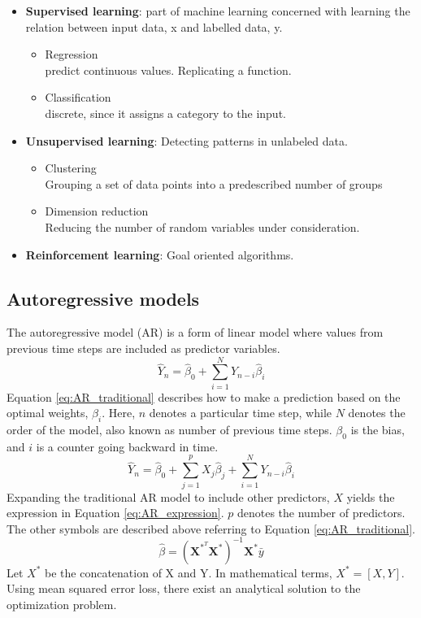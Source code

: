 \documentclass{article}
\begin{document}
\begin{itemize}
    \item \textbf{Supervised learning}: part of machine learning concerned with learning the relation between input data, x and labelled data, y.
    \begin{itemize}
        \item Regression\\predict continuous values. Replicating a function.
        \item Classification\\discrete, since it assigns a category to the input.
    \end{itemize}
    \item \textbf{Unsupervised learning}: Detecting patterns in unlabeled data.
    \begin{itemize}
        \item Clustering\\Grouping a set of data points into a predescribed number of groups
        \item Dimension reduction\\Reducing the number of random variables under consideration.
    \end{itemize}
    \item \textbf{Reinforcement learning}: Goal oriented algorithms.
\end{itemize}

\subsection{Autoregressive models} \label{sec:ARmodels}
The autoregressive model (AR) is a form of linear model where values from previous time steps are included as predictor variables. 
\begin{equation} \label{eq:AR_traditional}
    \hat{Y}_n = \hat{\beta}_0 + \sum_{i = 1}^{N} Y_{n-i} \hat{\beta}_{i}
\end{equation}
Equation \eqref{eq:AR_traditional} describes how to make a prediction based on the optimal weights, $\beta_i$. Here, $n$ denotes a particular time step, while $N$ denotes the order of the model, also known as number of previous time steps. $\beta_0$ is the bias, and $i$ is a counter going backward in time.
\begin{equation} \label{eq:AR_expression}
    \hat{Y}_n = \hat{\beta}_0 + \sum_{j=1}^p X_j\hat{\beta}_j + \sum_{i = 1}^{N} Y_{n-i}\hat{\beta}_{i}
\end{equation}
Expanding the traditional AR model to include other predictors, $X$ yields the expression in Equation \ref{eq:AR_expression}. $p$ denotes the number of predictors. The other symbols are described above referring to Equation \ref{eq:AR_traditional}.
\begin{equation} \label{eq:AR_solution}
    \hat{ \beta } = \left( \textbf{X}^{*^T}\textbf{X}^* \right)^{-1}\textbf{X}^*\bar{y}
\end{equation}
Let $X^*$ be the concatenation of X and Y. In mathematical terms, $X^*=[X, Y]$. Using mean squared error loss, there exist an analytical solution to the optimization problem. 
\end{document}
